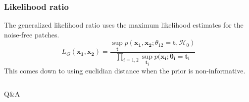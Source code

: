 \documentclass[compress]{beamer} %
\begin{document}
\begin{frame}
\frametitle{Likelihood ratio}
The generalized likelihood ratio uses the maximum likelihood estimates for the noise-free patches.
\[
L_G(\mathbf{x_1},\mathbf{x_2})=\frac{\sup_\mathbf{t}p(\mathbf{x_1},\mathbf{x_2};\theta_{12}=\mathbf{t},\mathcal{H}_0)}{\prod_{i=1,2}\sup_\mathbf{t_i}p(\mathbf{x_i};\mathbf{\theta_i}=\mathbf{t_i}}
\]
This comes down to using euclidian distance when the prior is non-informative.
\end{frame}
  
  \begin{frame}
   {\Huge
     \vspace {0.15\textwidth}
     \begin{columns}
       \begin{column}{0.3\textwidth}
       \end{column}
       \begin{column}{0.3\textwidth}
       \end{column}
       \begin{column}{0.3\textwidth}
       \end{column}
     \end{columns}
   }
   \vspace {0.025\textwidth}
   \begin{center}
   {\huge Q\&A}
   \end{center}
 \end{frame}
  
\end{document}
